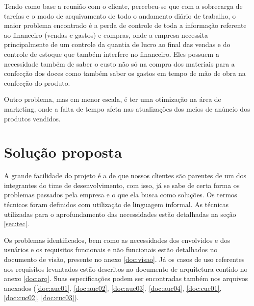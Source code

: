 Tendo como base a reunião com o cliente, percebeu-se que com a sobrecarga de tarefas e o modo de arquivamento de todo o andamento diário de trabalho, o maior problema encontrado é a perda de controle de toda a informação referente ao financeiro (vendas e gastos) e compras, onde a empresa necessita principalmente de um controle da quantia de lucro ao final das vendas e do controle de estoque que também interfere no financeiro. Eles possuem a necessidade também de saber o custo não só na compra dos materiais para a confecção dos doces como também saber os gastos em tempo de mão de obra na confecção do produto.

Outro problema, mas em menor escala, é ter uma otimização na área de marketing, onde a falta de tempo afeta nas atualizações dos meios de anúncio dos produtos vendidos.

\section{Solução proposta}

A grande facilidade do projeto é a de que nossos clientes são parentes de um dos integrantes do time de desenvolvimento, com isso, já se sabe de certa forma os problemas passados pela empresa e o que ela busca como soluções. Os termos técnicos foram definidos com utilização de linguagem informal. As técnicas utilizadas para o aprofundamento das necessidades estão detalhadas na seção \ref{sec:tec}. 

Os problemas identificados, bem como as necessidades dos envolvidos e dos usuários e os requisitos funcionais e não funcionais estão detalhados no documento de visão, presente no anexo \ref{doc:visao}. Já os casos de uso referentes aos requisitos levantados estão descritos no documento de arquitetura contido no anexo \ref{doc:arq}. Suas especificações podem ser encontradas também nos arquivos anexados (\ref{doc:auc01}, \ref{doc:auc02}, \ref{doc:auc03}, \ref{doc:auc04}, \ref{doc:cuc01}, \ref{doc:cuc02}, \ref{doc:cuc03}).